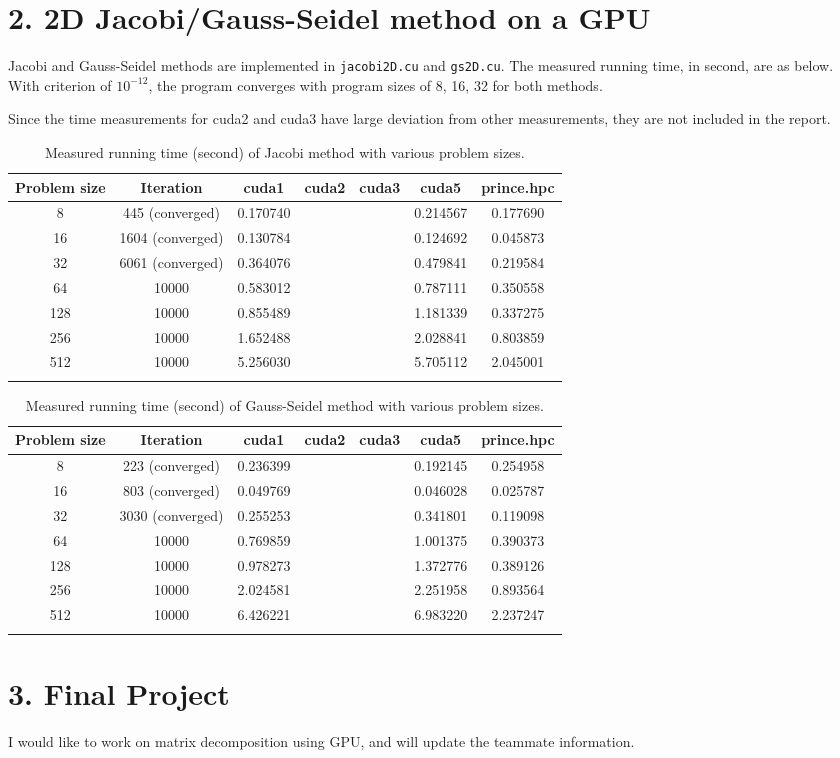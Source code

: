 \documentclass[amsmath,amssymb]{revtex4}
\begin{document}
\section{\label{sec:sec2}2. 2D Jacobi/Gauss-Seidel method on a GPU}
Jacobi and Gauss-Seidel methods are implemented in {\tt jacobi2D.cu} and {\tt gs2D.cu}. The measured running time, in second, are as below. With criterion of $10^{-12}$, the program converges with program sizes of 8, 16, 32 for both methods.

Since the time measurements for cuda2 and cuda3 have large deviation from other measurements, they are not included in the report.

\begin{longtable}{c | c | c | c | c | c | c}
    \hline 
Problem size & Iteration & cuda1 & cuda2 & cuda3 & cuda5 & prince.hpc \\ \hline \hline
8 &445 (converged)&0.170740&  &	 & 0.214567  & 0.177690 \\\hline
16 &1604 (converged)&0.130784&  &	 & 0.124692  & 0.045873 \\\hline
32 &6061 (converged)&0.364076&  &	 & 0.479841  & 0.219584 \\\hline
64 &10000&0.583012&  &	 & 0.787111  & 0.350558 \\\hline
128 &10000&0.855489&  &	 & 1.181339  & 0.337275 \\\hline
256 &10000&1.652488&  & & 2.028841  & 0.803859 \\\hline
512 &10000&5.256030&  &	 & 5.705112  & 2.045001 \\\hline
\caption{Measured running time (second) of Jacobi method with various problem sizes.}
\end{longtable}

\begin{longtable}{c | c | c | c | c | c | c}
    \hline 
Problem size& Iteration & cuda1 & cuda2 & cuda3 & cuda5 & prince.hpc \\ \hline \hline
8 &223 (converged)&0.236399&  &	 & 0.192145  &0.254958 \\\hline
16 &803 (converged)&0.049769&  &	 & 0.046028  & 0.025787 \\\hline
32 &3030 (converged)&0.255253&  &	 & 0.341801  & 0.119098 \\\hline
64 &10000&0.769859&  &	 & 1.001375  & 0.390373 \\\hline
128 &10000&0.978273&  &	 & 1.372776  & 0.389126 \\\hline
256 &10000&2.024581&  &	 & 2.251958  & 0.893564 \\\hline
512 &10000&6.426221&  & & 6.983220  & 2.237247 \\\hline
\caption{Measured running time (second) of Gauss-Seidel method with various problem sizes.}
\end{longtable}

\section{\label{sec:sec3}3. Final Project}
I would like to work on matrix decomposition using GPU, and will update the teammate information.
\end{document}
